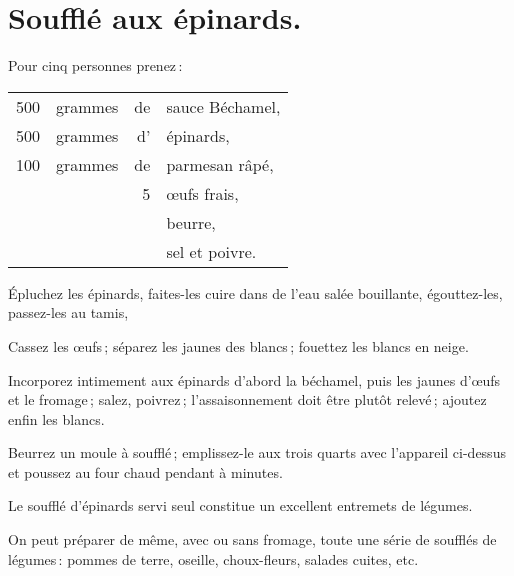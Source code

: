 \section*{\centering Soufflé aux épinards.}
{}

Pour cinq personnes prenez :

\footnotesize
\begin{longtable}{rrrp{16em}}
    500 & grammes & de & sauce Béchamel,                                                                  \\
    500 & grammes & d' & épinards,                                                                        \\
    100 & grammes & de & parmesan râpé,                                                                   \\
        &         &  5 & œufs frais,                                                                      \\
        &         &    & beurre,                                                                          \\
        &         &    & sel et poivre.                                                                   \\
\end{longtable}
\normalsize

Épluchez les épinards, faites-les cuire dans de l'eau salée bouillante,
égouttez-les, passez-les au tamis,

Cassez les œufs ; séparez les jaunes des blancs ; fouettez les blancs en neige.

Incorporez intimement aux épinards d'abord la béchamel, puis les jaunes d'œufs
et le fromage ; salez, poivrez ; l'assaisonnement doit être plutôt relevé ;
ajoutez enfin les blancs.

Beurrez un moule à soufflé ; emplissez-le aux trois quarts avec l'appareil
ci-dessus et poussez au four chaud pendant {\mmm} à {\mmm} minutes.

Le soufflé d'épinards servi seul constitue un excellent entremets de légumes.

\sk

On peut préparer de même, avec ou sans fromage, toute une série de soufflés de
légumes : pommes de terre, oseille, choux-fleurs, salades cuites, etc.

